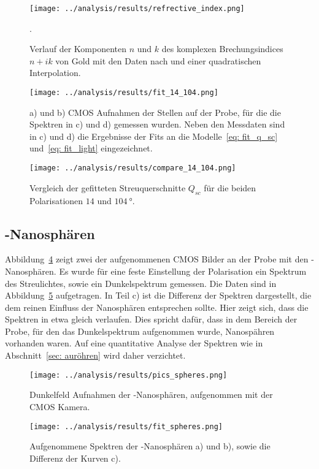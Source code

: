 \begin{figure}
  \centering
  \texttt{[image: ../analysis/results/refrective\_index.png]}
  \caption{Verlauf der Komponenten $n$ und $k$ des komplexen Brechungsindices $n + i k$
  von Gold mit den Daten nach \cite{ref_index_au} und einer quadratischen Interpolation.}.
  \label{fig: ref_index}
\end{figure}


\begin{figure}
  \centering
  \texttt{[image: ../analysis/results/fit\_14\_104.png]}
  \caption{a) und b) CMOS Aufnahmen der Stellen auf der Probe, für die die Spektren in c) und d)
  gemessen wurden. Neben den Messdaten sind in c) und d) die Ergebnisse der Fits an die Modelle~\eqref{eq: fit_q_sc}
  und~\eqref{eq: fit_light} eingezeichnet.}
  \label{fig: au_röhren_fits}
\end{figure}

\begin{figure}
  \centering
  \texttt{[image: ../analysis/results/compare\_14\_104.png]}
  \caption{Vergleich der gefitteten Streuquerschnitte $Q_{sc}$ für die beiden Polarisationen $14$ und $\SI{104}{\degree}$.}
  \label{fig: compare_q_sc}
\end{figure}
\subsection{-Nanosphären}
Abbildung~\ref{fig: au_sphären_bilder} zeigt zwei der aufgenommenen CMOS Bilder an der Probe mit den -Nanosphären.
Es wurde für eine feste Einstellung der Polarisation ein Spektrum des Streulichtes, sowie ein
Dunkelspektrum gemessen. Die Daten sind in Abbildung~\ref{fig: au_sphären_data} aufgetragen. In Teil c) ist die Differenz
der Spektren dargestellt, die dem reinen Einfluss der Nanosphären entsprechen sollte.
Hier zeigt sich, dass die Spektren in etwa gleich verlaufen.
Dies spricht dafür, dass in dem Bereich der Probe, für den das Dunkelspektrum aufgenommen wurde, Nanospähren
vorhanden waren.
Auf eine quantitative Analyse der Spektren wie in Abschnitt~\ref{sec: auröhren} wird daher verzichtet.

\begin{figure}
  \centering
  \texttt{[image: ../analysis/results/pics\_spheres.png]}
  \caption{Dunkelfeld Aufnahmen der -Nanosphären, aufgenommen mit der CMOS Kamera.}
  \label{fig: au_sphären_bilder}
\end{figure}

\begin{figure}
  \centering
  \texttt{[image: ../analysis/results/fit\_spheres.png]}
  \caption{Aufgenommene Spektren der -Nanosphären a) und b), sowie die Differenz der Kurven c).}
  \label{fig: au_sphären_data}
\end{figure}
